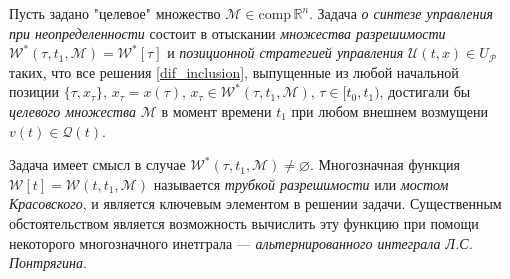 Пусть задано "целевое" множество \( \mathcal{M} \in \text{comp} \, \mathbb{R}^n \).
Задача \emph{о синтезе управления при неопределенности} состоит в отыскании
 \emph{множества разрешимости} \( \mathcal{W}^*(\tau, t_1, \mathcal{M}) = 
 \mathcal{W}^*[\tau] \) и \emph{позиционной стратегией управления}
 \( \mathcal{U}(t,x) \in U_{\mathcal{P}} \) таких, что все решения
 \eqref{dif_inclusion}, выпущенные из любой начальной позиции \( \{\tau, 
 x_{\tau}\}, \, x_{\tau} = x(\tau), \, x_{\tau} \in \mathcal{W}^*(\tau, t_1, 
 \mathcal{M}), \, \tau \in [t_0, t_1) \), достигали бы \emph{целевого множества}
 \( \mathcal{M} \) в момент времени \( t_1 \) при любом внешнем возмущени
 \( v(t) \in \mathcal{Q}(t) \). 

Задача имеет смысл в случае \( \mathcal{W}^*(\tau, t_1, \mathcal{M}) \ne 
 \varnothing \). Многозначная функция \( \mathcal{W}[t] = \mathcal{W}(t, 
 t_1,\mathcal{M}) \) называется \emph{трубкой разрешимости} или 
 \emph{мостом Красовского}, и является ключевым элементом в решении задачи.
 Существенным обстоятельством является возможность вычислить эту функцию 
 при помощи некоторого многозначного инетграла --- \emph{альтернированного 
 интеграла Л.С. Понтрягина}.

